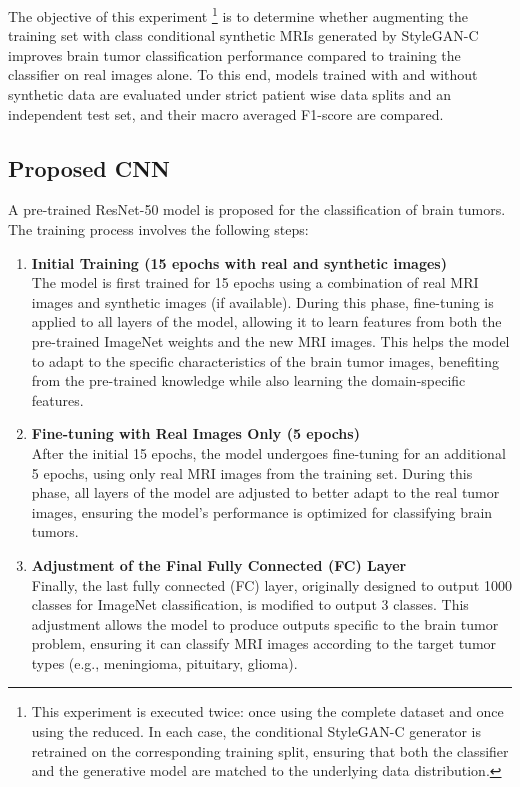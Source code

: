 The objective of this experiment \footnote{This experiment is executed twice: once using the complete dataset and once using the reduced. In each case, the conditional StyleGAN-C generator is retrained on the corresponding training split, ensuring that both the classifier and the generative model are matched to the underlying data distribution.} is to determine whether augmenting the training set with class conditional synthetic MRIs generated by StyleGAN-C improves brain tumor classification performance compared to training the classifier on real images alone. To this end, models trained with and without synthetic data are evaluated under strict patient wise data splits and an independent test set, and their macro averaged F1-score are compared.


\subsection{Proposed CNN}

A pre-trained ResNet-50 \cite{he2015deepresiduallearningimage} model is proposed for the classification of brain tumors. The training process involves the following steps:

\begin{enumerate}
    \item \textbf{Initial Training (15 epochs with real and synthetic images)} \\
    The model is first trained for 15 epochs using a combination of real MRI images and synthetic images (if available). During this phase, fine-tuning is applied to all layers of the model, allowing it to learn features from both the pre-trained ImageNet weights and the new MRI images. This helps the model to adapt to the specific characteristics of the brain tumor images, benefiting from the pre-trained knowledge while also learning the domain-specific features.

    \item \textbf{Fine-tuning with Real Images Only (5 epochs)} \\
    After the initial 15 epochs, the model undergoes fine-tuning for an additional 5 epochs, using only real MRI images from the training set. During this phase, all layers of the model are adjusted to better adapt to the real tumor images, ensuring the model’s performance is optimized for classifying brain tumors.

    \item \textbf{Adjustment of the Final Fully Connected (FC) Layer} \\
    Finally, the last fully connected (FC) layer, originally designed to output 1000 classes for ImageNet classification, is modified to output 3 classes. This adjustment allows the model to produce outputs specific to the brain tumor problem, ensuring it can classify MRI images according to the target tumor types (e.g., meningioma, pituitary, glioma).
\end{enumerate}

